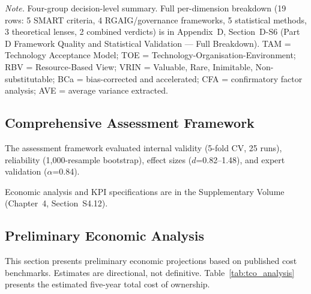 \vspace{0.4em}
\noindent\textit{Note.} Four-group decision-level summary. Full per-dimension breakdown (19 rows: 5 SMART criteria, 4 RGAIG/governance frameworks, 5 statistical methods, 3 theoretical lenses, 2 combined verdicts) is in Appendix~D, Section~D-S6 (Part D Framework Quality and Statistical Validation --- Full Breakdown). TAM = Technology Acceptance Model; TOE = Technology-Organisation-Environment; RBV = Resource-Based View; VRIN = Valuable, Rare, Inimitable, Non-substitutable; BCa = bias-corrected and accelerated; CFA = confirmatory factor analysis; AVE = average variance extracted.

\subsection{Comprehensive Assessment Framework}

The assessment framework evaluated internal validity (5-fold CV, 25 runs), reliability (1,000-resample bootstrap), effect sizes ($d$=0.82--1.48), and expert validation ($\alpha$=0.84).



Economic analysis and KPI specifications are in the Supplementary Volume (Chapter~4, Section~S4.12).

\iffalse
\subsection{Preliminary Economic Analysis}

This section presents preliminary economic projections based on published cost benchmarks. Estimates are directional, not definitive. Table~\ref{tab:tco_analysis} presents the estimated five-year total cost of ownership.

